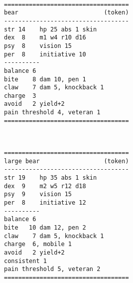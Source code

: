 \

\goodbreak \begin{samepage} \small \begin{verbatim}
===================================
bear                        (token)
-----------------------------------
str 14    hp 25 abs 1 skin
dex  8    m1 w4 r10 d16
psy  8    vision 15
per  8    initiative 10
----------
balance 6
bite    8 dam 10, pen 1
claw    7 dam 5, knockback 1
charge  3
avoid   2 yield+2
pain threshold 4, veteran 1
===================================
\end{verbatim} \normalsize \end{samepage}

\

\goodbreak \begin{samepage} \small \begin{verbatim}
===================================
large bear                  (token)
-----------------------------------
str 19    hp 35 abs 1 skin
dex  9    m2 w5 r12 d18
psy  9    vision 15
per  8    initiative 12
----------
balance 6
bite   10 dam 12, pen 2
claw    7 dam 5, knockback 1
charge  6, mobile 1
avoid   2 yield+2
consistent 1
pain threshold 5, veteran 2
===================================
\end{verbatim} \normalsize \end{samepage}

\







\clearpage
{}


